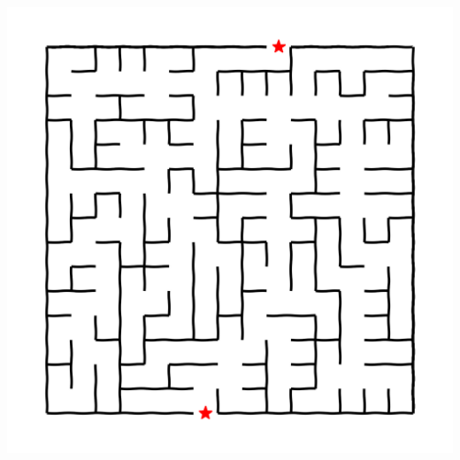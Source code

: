 \documentclass[landscape]{article}
\begin{document}
\begin{multicols}{3}
\center\includegraphics[width=\linewidth]{images/maze_j.png}

\renewcommand*\sudokuformat[1]{\sffamily#1}
\setlength{}
\setlength\sudokuthickline{1pt}
\begin{center}
	
\end{center}
\setlength\sudokuthickline{0.3pt}
\begin{center}
	
\end{center}


\end{multicols}
\end{document}
